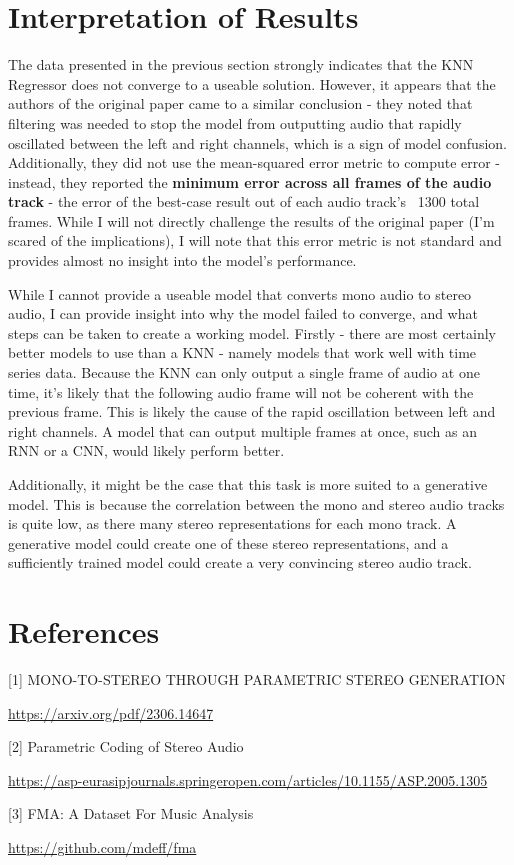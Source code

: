 \documentclass{article}
\begin{document}
\section{Interpretation of Results}
The data presented in the previous section strongly indicates that the KNN Regressor does not converge to a useable solution. However, it appears that the authors of the original paper came to a similar conclusion - they noted that filtering was needed to stop the model from outputting audio that rapidly oscillated between the left and right channels, which is a sign of model confusion. Additionally, they did not use the mean-squared error metric to compute error - instead, they reported the 
\textbf{minimum error across all frames of the audio track} - the error of the best-case result out of each audio track's ~1300 total frames. While I will not directly challenge the results of the original paper (I'm scared of the implications), I will note that this error metric is not standard and provides almost no insight into the model's performance.

While I cannot provide a useable model that converts mono audio to stereo audio, I can provide insight into why the model failed to converge, and what steps can be taken to create a working model. Firstly - there are most certainly better models to use than a KNN - namely models that work well with time series data. Because the KNN can only output a single frame of audio at one time, it's likely that the following audio frame will not be coherent with the previous frame. This is likely the cause of the rapid oscillation between left and right channels. A model that can output multiple frames at once, such as an RNN or a CNN, would likely perform better.

Additionally, it might be the case that this task is more suited to a generative model. This is because the correlation between the mono and stereo audio tracks is quite low, as there many stereo representations for each mono track. A generative model could create one of these stereo representations, and a sufficiently trained model could create a very convincing stereo audio track. 

\section*{References}

\small

[1] MONO-TO-STEREO THROUGH PARAMETRIC STEREO GENERATION

\url{https://arxiv.org/pdf/2306.14647}


[2] Parametric Coding of Stereo Audio

\url{https://asp-eurasipjournals.springeropen.com/articles/10.1155/ASP.2005.1305}

[3] FMA: A Dataset For Music Analysis

\url{https://github.com/mdeff/fma}
\end{document}

